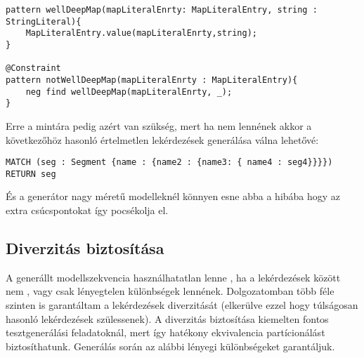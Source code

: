 \begin{lstlisting}[style=viatrasmall]
pattern wellDeepMap(mapLiteralEnrty: MapLiteralEntry, string : StringLiteral){
	MapLiteralEntry.value(mapLiteralEnrty,string);
}

@Constraint
pattern notWellDeepMap(mapLiteralEnrty : MapLiteralEntry){
	neg find wellDeepMap(mapLiteralEnrty, _);
}
\end{lstlisting}

Erre a mintára pedig azért van szükség, mert ha nem lennének akkor a következőhöz hasonló értelmetlen lekérdezések generálása válna lehetővé:

\begin{lstlisting}[style=cyphersmall]
MATCH (seg : Segment {name : {name2 : {name3: { name4 : seg4}}}}) 
RETURN seg
\end{lstlisting}

És a generátor nagy méretű modelleknél könnyen esne abba a hibába hogy az extra csúcspontokat így pocsékolja el.


\subsection{Diverzitás biztosítása}
A generállt modellszekvencia használhatatlan lenne , ha a lekérdezések között nem , vagy csak lényegtelen különbségek lennének. Dolgozatomban több féle szinten is garantáltam a lekérdezések diverzitását (elkerülve ezzel hogy túlságosan hasonló lekérdezések szülessenek). A diverzitás biztosítása kiemelten fontos tesztgenerálási feladatoknál, mert így hatékony ekvivalencia partícionálást biztosíthatunk. Generálás során az alábbi lényegi különbségeket garantáljuk.

